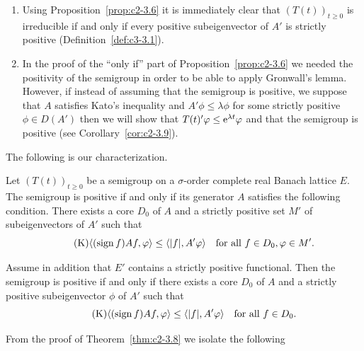 \begin{remark}\label{rem:c2-3.7}
\begin{enumerate}[\upshape (i), wide, labelindent=.25em]%
\item \label{rem:c2-3.7-1}
Using Proposition~\ref{prop:c2-3.6} it is immediately clear that
$(T(t))_{t \geq 0}$ is irreducible if and only if every positive subeigenvector
of\/ $A'$ is strictly positive (\cf Definition~\ref{def:c3-3.1}). 

\item \label{rem:c2-3.7-2}
In the proof of the \enquote{only if} part of Proposition~\ref{prop:c2-3.6} we needed the
positivity of the semigroup in order to be able to apply Gronwall's
lemma.
However, if instead of assuming that the semigroup is positive, 
we suppose that $A$ satisfies Kato's inequality and $A'\phi \leq \lambda\phi$ for some strictly positive $\phi \in D(A')$ then we will show that $T(t)'\phi \leq
\eu^{\lambda t} \phi$ and that the semigroup is positive (see Corollary~\ref{cor:c2-3.9}).
\end{enumerate}
\end{remark}
The following is our characterization.
\begin{theorem}\label{thm:c2-3.8}
Let $(T(t))_{t \geq 0}$ be a semigroup on a $\sigma$-order complete real Banach lattice $E$. 
The semigroup is positive if and only if its generator $A$ satisfies the following condition.
There exists a core $D_{0}$ of\/ $A$ and a strictly positive set $M'$ of subeigenvectors of\/ $A'$ such that
\begin{equation}\label{eq:c2-K4} \tag{K}
\langle(\sign f) Af,\phi \rangle \leq \langle|f|,A'\phi\rangle \quad \text{for all } f \in D_{0}, \phi \in M'.
\end{equation}
\end{theorem}
\begin{corollary}\label{cor:c2-3.9}
Assume in addition that $E'$ contains a strictly positive functional. 
Then the semigroup is positive if and only if there
exists a core $D_{0}$ of\/ $A$ and a strictly positive subeigenvector $\phi$
of\/ $A'$ such that
\begin{equation}\label{eq:c2-K5} \tag{K}
\langle(\sign f) Af,\phi \rangle \leq \langle|f|,A'\phi\rangle \quad \text{for all } f \in D_{0}.
\end{equation}
\end{corollary}
From the proof of Theorem~\ref{thm:c2-3.8}   we isolate the following
